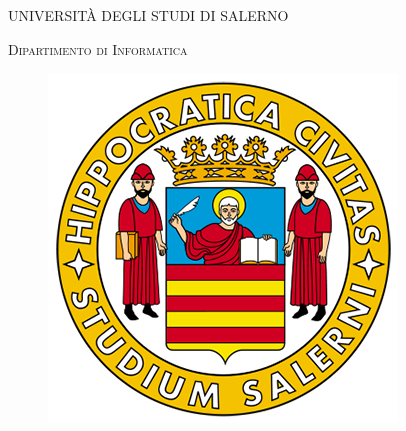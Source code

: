 \linespread{1} %

\thispagestyle{empty}
\large


\begin{center}
	\LARGE{\uppercase{Università degli Studi di Salerno}}\\
	\vspace{2mm}
\end{center}

\begin{center}   
	\LARGE{{\textsc{Dipartimento di Informatica}}}
	\\    
	
\end{center}

\begin{figure}[h]
	\begin{center}
		\includegraphics[scale=0.37]{figure/logo_standard.png}
	\end{center}
\end{figure}

